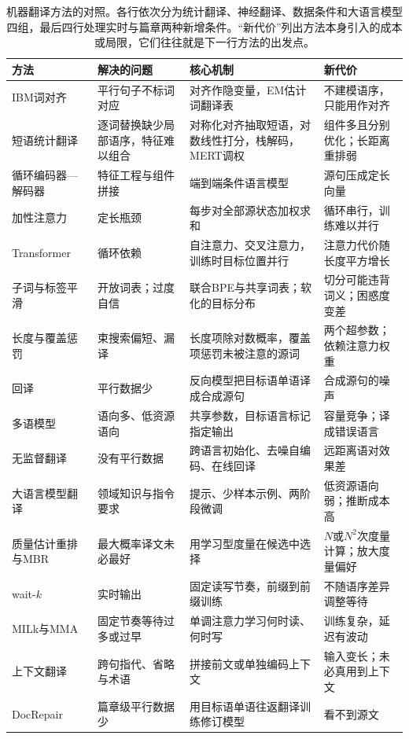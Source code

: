 \begin{table}[htbp]
  \small
  \begin{tabularx}{\linewidth}{@{}>{\raggedright\arraybackslash}p{32mm}>{\raggedright\arraybackslash}p{31mm}>{\raggedright\arraybackslash}p{44mm}>{\raggedright\arraybackslash}X@{}}
    \toprule
    方法 & 解决的问题 & 核心机制 & 新代价\\
    \midrule
    IBM词对齐 & 平行句子不标词对应 & 对齐作隐变量，EM估计词翻译表 & 不建模语序，只能用作对齐\\
    短语统计翻译 & 逐词替换缺少局部语序，特征难以组合 & 对称化对齐抽取短语，对数线性打分，栈解码，MERT调权 & 组件多且分别优化；长距离重排弱\\
    循环编码器—解码器 & 特征工程与组件拼接 & 端到端条件语言模型 & 源句压成定长向量\\
    加性注意力 & 定长瓶颈 & 每步对全部源状态加权求和 & 循环串行，训练难以并行\\
    Transformer & 循环依赖 & 自注意力、交叉注意力，训练时目标位置并行 & 注意力代价随长度平方增长\\
    子词与标签平滑 & 开放词表；过度自信 & 联合BPE与共享词表；软化的目标分布 & 切分可能违背词义；困惑度变差\\
    长度与覆盖惩罚 & 束搜索偏短、漏译 & 长度项除对数概率，覆盖项惩罚未被注意的源词 & 两个超参数；依赖注意力权重\\
    回译 & 平行数据少 & 反向模型把目标语单语译成合成源句 & 合成源句的噪声\\
    多语模型 & 语向多、低资源语向 & 共享参数，目标语言标记指定输出 & 容量竞争；译成错误语言\\
    无监督翻译 & 没有平行数据 & 跨语言初始化、去噪自编码、在线回译 & 远距离语对效果差\\
    大语言模型翻译 & 领域知识与指令要求 & 提示、少样本示例、两阶段微调 & 低资源语向弱；推断成本高\\
    质量估计重排与MBR & 最大概率译文未必最好 & 用学习型度量在候选中选择 & $N$或$N^2$次度量计算；放大度量偏好\\
    wait-$k$ & 实时输出 & 固定读写节奏，前缀到前缀训练 & 不随语序差异调整等待\\
    MILk与MMA & 固定节奏等待过多或过早 & 单调注意力学习何时读、何时写 & 训练复杂，延迟有波动\\
    上下文翻译 & 跨句指代、省略与术语 & 拼接前文或单独编码上下文 & 输入变长；未必真用到上下文\\
    DocRepair & 篇章级平行数据少 & 用目标语单语往返翻译训练修订模型 & 看不到源文\\
    \bottomrule
  \end{tabularx}
  \caption{机器翻译方法的对照。各行依次分为统计翻译、神经翻译、数据条件和大语言模型四组，最后四行处理实时与篇章两种新增条件。“新代价”列出方法本身引入的成本或局限，它们往往就是下一行方法的出发点。}
  \label{tab:nlp-generation-translation-methods}
\end{table}

